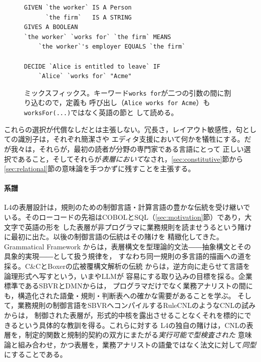 \documentclass[11pt,a4paper]{ltjsarticle}
\newcommand{\bq}{\char96\relax}
\newcommand{\code}[1]{\texttt{\small #1}}
\begin{document}
\begin{figure}[t]
\begin{lstlisting}
GIVEN `the worker` IS A Person
      `the firm`   IS A STRING
GIVES A BOOLEAN
`the worker` `works for` `the firm` MEANS
    `the worker`'s employer EQUALS `the firm`

DECIDE `Alice is entitled to leave` IF
    `Alice` `works for` "Acme"
\end{lstlisting}
\caption{ミックスフィックス。キーワード\code{\bq works for\bq}が二つの引数の間に割り込むので，定義も
呼び出し（\code{\bq Alice\bq{} \bq works for\bq{} \bq Acme\bq}）も\code{worksFor(...)}ではなく英語の節と
して読める。}
\label{fig:mixfix}
\end{figure}

これらの選択が代償なしだとは主張しない。冗長さ，レイアウト敏感性，句としての識別子は，それぞれ簡潔さや
エディタ支援において何かを犠牲にする。だが我々は，それらが，最初の読者が分野の専門家である言語にとって
正しい選択であること，そしてそれらが\emph{表層において}なされ，\ref{sec:constitutive}節から
\ref{sec:relational}節の意味論を手つかずに残すことを主張する。

\paragraph{系譜}
L4の表層設計は，規則のための制御言語・計算言語の豊かな伝統を受け継いでいる。そのローコードの先祖はCOBOLとSQL（\ref{sec:motivation}節）であり，大文字で英語の形を
した表層が非プログラマに業務規則を読ませうるという賭けに最初に出た。以後の制御言語の伝統はその賭けを
精緻化してきた。Grammatical Framework
\cite{ranta2004gf}からは，表層構文を型理論的文法――抽象構文とその具象的実現――として扱う規律を，
すなわち同一規則の多言語的描画への道を採る。C\&CとBoxerの広被覆構文解析の伝統
\cite{curran2007cc,bos2008boxer}からは，逆方向に走らせて言語を論理形式へ写すという，いまやLLMが
容易にする取り込みの目標を採る。企業標準であるSBVR\cite{omg_sbvr}とDMN\cite{omg_dmn}からは，
プログラマだけでなく業務アナリストの間にも，構造化された語彙・規則・判断表への確かな需要があることを学ぶ。
そして，業務規則の制御言語をSBVRへコンパイルするRuleCNL\cite{feuto2014rulecnl}のようなCNLの試みからは，
制御された表層が，形式的中核を露出させることなくそれを標的にできるという具体的な教訓を得る。これらに対する
L4の独自の賭けは，CNLの表層を，制定的関数と規制的契約の双方にまたがる\emph{実行可能で型検査された}
意味論と組み合わせ，かつ表層を，業務アナリストの語彙ではなく法文に対して\emph{同型}にすることである。

\end{document}
